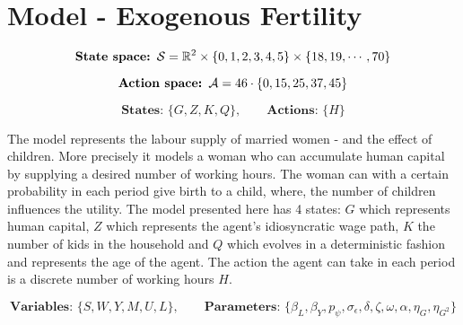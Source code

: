 \section{Model - Exogenous Fertility}\label{sec:model1}

\begin{equation}
    \textbf{State space: }\mathcal{S} = \mathbb{R}^{2} \times \{0, 1, 2, 3, 4, 5\} \times \{ 18, 19, \cdots, 70\}
\end{equation}

\begin{equation}
    \textbf{Action space: }\mathcal{A}  = 46 \cdot \{0, 15, 25, 37, 45\} 
\end{equation}

\begin{equation}
    \textbf{States: }\{G, Z, K, Q\}, \qquad \textbf{Actions: } \{H\} 
\end{equation}

The model represents the labour supply of married women - and the effect of children. More precisely it models a woman who can accumulate human capital by supplying a desired number of working hours. The woman can with a certain probability in each period give birth to a child, where, the number of children influences the utility. The model presented here has 4 states: $G$ which represents human capital, $Z$ which represents the agent's idiosyncratic wage path, $K$ the number of kids in the household and $Q$ which evolves in a deterministic fashion and represents the age of the agent. The action the agent can take in each period is a discrete number of working hours $H$.

\begin{equation}
    \textbf{Variables: }\{S, W, Y, M, U, L\},  \qquad \textbf{Parameters: } \{\beta_L, \beta_Y, p_\psi, \sigma_\epsilon, \delta, \zeta, \omega, \alpha, \eta_G, \eta_{G^2}\}
\end{equation}


